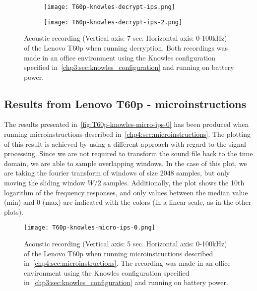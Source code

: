 \begin{figure}[ht]
    \begin{subfigure}{0.5\textwidth}
        \centering
        \texttt{[image: T60p-knowles-decrypt-ips.png]}
        \caption{}
        \label{fig:T60p-knowles-decrypt-ips}
    \end{subfigure}
    \begin{subfigure}{0.5\textwidth}
        \centering
        \texttt{[image: T60p-knowles-decrypt-ips-2.png]}
        \caption{}
        \label{fig:T60p-knowles-decrypt-ips-2}
    \end{subfigure}
    \caption{Acoustic recording (Vertical axis: 7 sec. Horizontal axis: 0-100kHz) of the Lenovo T60p when running decryption.
    Both recordings was made in an office environment using the Knowles configuration specified in~\autoref{chp3:sec:knowles_configuration} and running on battery power. }
    \label{fig:T60p-knowles-decrypt-ips}
\end{figure}

\subsection{Results from Lenovo T60p - microinstructions}\label{chp5:subsec:t60p_knowles_results_micro}
The results presented in~\autoref{fig:T60p-knowles-micro-ips-0} has been produced when running microinstructions described in~\autoref{chp4:sec:microinstructions}.
The plotting of this result is achieved by using a different approach with regard to the signal processing. 
Since we are not required to transform the sound file back to the time domain, we are able to sample overlapping windows.
In the case of this plot, we are taking the fourier transform of windows of size 2048 samples, but only moving the sliding window \({W/2}\) samples.
Additionally, the plot shows the 10th logarithm of the frequency responses, and only values between the median value (min) and 0 (max) are indicated with the colors (in a linear scale, as in the other plots). 
\begin{figure}[ht]
    \centering
    \texttt{[image: T60p-knowles-micro-ips-0.png]}
    \caption{Acoustic recording (Vertical axis: 5 sec. Horizontal axis: 0-100kHz) of the Lenovo T60p when running microinstructions described in~\autoref{chp4:sec:microinstructions}. The recording was made in an office environment using the Knowles configuration specified in~\autoref{chp3:sec:knowles_configuration} and running on battery power. }
    \label{fig:T60p-knowles-micro-ips-0}
\end{figure}
